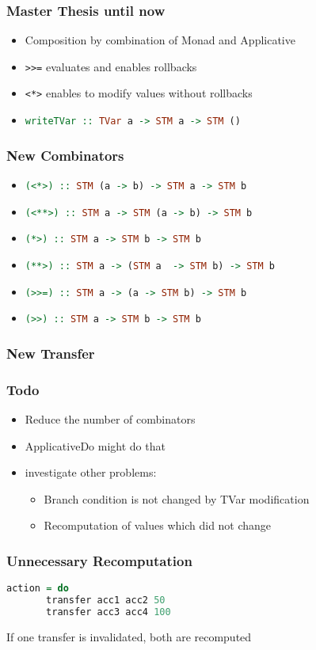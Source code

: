 \documentclass{beamer}
\begin{document}
  \begin{frame}
   \frametitle{Master Thesis until now}
   \begin{itemize}\setlength\itemsep{1em}
    \item Composition by combination of Monad and Applicative
    \item\lstinline{>>=} evaluates and enables rollbacks
    \item\lstinline{<*>} enables to modify values without rollbacks
    \item \lstinline[language=Haskell]{writeTVar :: TVar a -> STM a -> STM ()} 
   \end{itemize}
  \end{frame}
  
  \begin{frame}
   \frametitle{New Combinators}
   \begin{itemize}\setlength\itemsep{1em}
    \item \lstinline[language=Haskell]{(<*>) :: STM (a -> b) -> STM a -> STM b}
    \item \lstinline[language=Haskell]{(<**>) :: STM a -> STM (a -> b) -> STM b}
    \item \lstinline[language=Haskell]{(*>) :: STM a -> STM b -> STM b}
    \item \lstinline[language=Haskell]{(**>) :: STM a -> (STM a  -> STM b) -> STM b}
    \item \lstinline[language=Haskell]{(>>=) :: STM a -> (a -> STM b) -> STM b}
    \item \lstinline[language=Haskell]{(>>) :: STM a -> STM b -> STM b}
   \end{itemize}
  \end{frame}

  
  \begin{frame}[fragile]
    \frametitle{New Transfer}
    
\end{frame}
  
  
  
  
  \begin{frame}
   \frametitle{Todo}
   \begin{itemize}\setlength\itemsep{1em}
    \item Reduce the number of combinators
    \item ApplicativeDo might do that
    \item investigate other problems:
      \begin{itemize}
        \item Branch condition is not changed by TVar modification
        \item Recomputation of values which did not change
      \end{itemize}
   \end{itemize}
  \end{frame}

  \begin{frame}[fragile]
    \frametitle{Unnecessary Recomputation}
    \begin{lstlisting}[language=Haskell]
     action = do
       transfer acc1 acc2 50
       transfer acc3 acc4 100
    \end{lstlisting}
    \vfill
    If one transfer is invalidated, both are recomputed
\end{frame}


  
\end{document}
